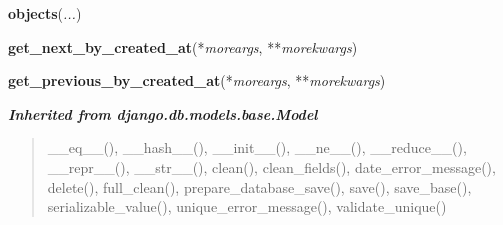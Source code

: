     \vspace{0.5ex}

\hspace{.8\funcindent}\begin{boxedminipage}{\funcwidth}

    \raggedright \textbf{objects}(\textit{...})

\setlength{\parskip}{2ex}
\setlength{\parskip}{1ex}
    \end{boxedminipage}

    \label{spatio_main:models:PoliceReport:get_next_by_created_at}

    \vspace{0.5ex}

\hspace{.8\funcindent}\begin{boxedminipage}{\funcwidth}

    \raggedright \textbf{get\_next\_by\_created\_at}(*\textit{moreargs}, **\textit{morekwargs})

\setlength{\parskip}{2ex}
\setlength{\parskip}{1ex}
    \end{boxedminipage}

    \label{spatio_main:models:PoliceReport:get_previous_by_created_at}

    \vspace{0.5ex}

\hspace{.8\funcindent}\begin{boxedminipage}{\funcwidth}

    \raggedright \textbf{get\_previous\_by\_created\_at}(*\textit{moreargs}, **\textit{morekwargs})

\setlength{\parskip}{2ex}
\setlength{\parskip}{1ex}
    \end{boxedminipage}


\large{\textbf{\textit{Inherited from django.db.models.base.Model}}}

\begin{quote}
\_\_eq\_\_(), \_\_hash\_\_(), \_\_init\_\_(), \_\_ne\_\_(), \_\_reduce\_\_(), \_\_repr\_\_(), \_\_str\_\_(), clean(), clean\_fields(), date\_error\_message(), delete(), full\_clean(), prepare\_database\_save(), save(), save\_base(), serializable\_value(), unique\_error\_message(), validate\_unique()
\end{quote}

